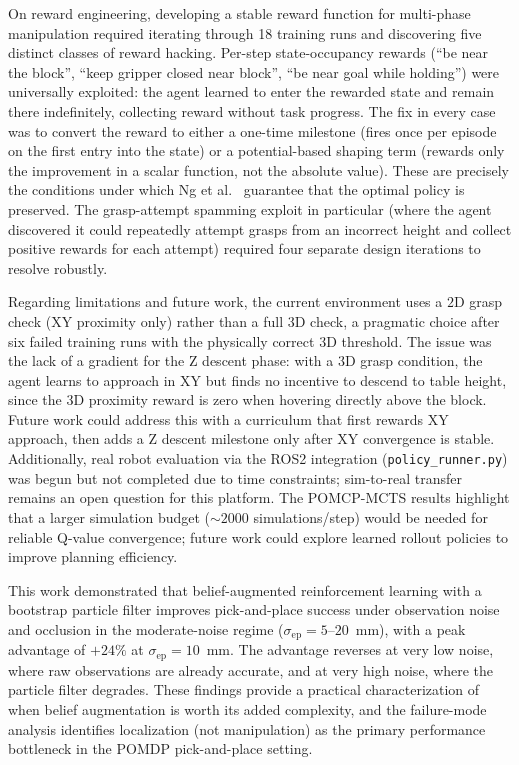 \documentclass[conference]{IEEEtran}
\newcommand{\sigmaep}{\sigma_{\text{ep}}}
\begin{document}
On reward engineering, developing a stable reward function for multi-phase
manipulation required iterating through 18 training runs and discovering five
distinct classes of reward hacking.
Per-step state-occupancy rewards (``be near the block'', ``keep gripper closed
near block'', ``be near goal while holding'') were universally exploited:
the agent learned to enter the rewarded state and remain there indefinitely,
collecting reward without task progress.
The fix in every case was to convert the reward to either a one-time milestone
(fires once per episode on the first entry into the state) or a
potential-based shaping term (rewards only the improvement in a scalar function,
not the absolute value).
These are precisely the conditions under which Ng et al.~\cite{ng1999potential}
guarantee that the optimal policy is preserved.
The grasp-attempt spamming exploit in particular (where the agent
discovered it could repeatedly attempt grasps from an incorrect height and
collect positive rewards for each attempt) required four separate design
iterations to resolve robustly.

Regarding limitations and future work, the current environment uses a $2$D
grasp check (XY proximity only) rather than a full $3$D check, a pragmatic
choice after six failed training runs
with the physically correct $3$D threshold.
The issue was the lack of a gradient for the Z descent phase: with a $3$D
grasp condition, the agent learns to approach in XY but finds no incentive
to descend to table height, since the $3$D proximity reward is zero when
hovering directly above the block.
Future work could address this with a curriculum that first rewards XY
approach, then adds a Z descent milestone only after XY convergence is
stable.
Additionally, real robot evaluation via the ROS2 integration
(\texttt{policy\_runner.py}) was begun but not completed due to time constraints;
sim-to-real transfer remains an open question for this platform.
The POMCP-MCTS results highlight that a larger simulation budget (${\sim}2000$
simulations/step) would be needed for reliable Q-value convergence; future work
could explore learned rollout policies to improve planning efficiency.

This work demonstrated that belief-augmented reinforcement learning with a bootstrap
particle filter improves pick-and-place success under observation noise and
occlusion in the moderate-noise regime ($\sigmaep = 5$--$20$~mm), with a peak
advantage of $+24\%$ at $\sigmaep = 10$~mm.
The advantage reverses at very low noise, where raw observations are already
accurate, and at very high noise, where the particle filter degrades.
These findings provide a practical characterization of when belief
augmentation is worth its added complexity, and the failure-mode analysis
identifies localization (not manipulation) as the primary performance
bottleneck in the POMDP pick-and-place setting.
\end{document}
